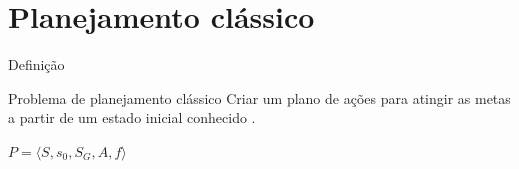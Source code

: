 \begin{frame}
  \titlepage
\end{frame}


%     
% 


\section{Planejamento clássico}
\begin{frame}{Definição}
    \begin{block}{Problema de planejamento clássico}
        Criar um plano de ações para atingir as metas a partir de um estado 
inicial conhecido \cite{Ghallab:2004}. \\
        \begin{center}
            $P = \langle S, s_0, S_G, A, f \rangle$
        \end{center}
    \end{block}
    
\end{frame}

